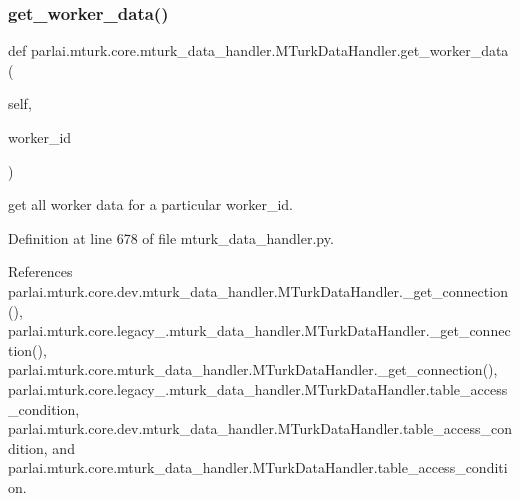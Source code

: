 \subsubsection{\texorpdfstring{get\+\_\+worker\+\_\+data()}{get\_worker\_data()}}
{\footnotesize\ttfamily def parlai.\+mturk.\+core.\+mturk\+\_\+data\+\_\+handler.\+M\+Turk\+Data\+Handler.\+get\+\_\+worker\+\_\+data (\begin{DoxyParamCaption}\item[{}]{self,  }\item[{}]{worker\+\_\+id }\end{DoxyParamCaption})}

\begin{DoxyVerb}get all worker data for a particular worker_id.\end{DoxyVerb}
 

Definition at line 678 of file mturk\+\_\+data\+\_\+handler.\+py.



References parlai.\+mturk.\+core.\+dev.\+mturk\+\_\+data\+\_\+handler.\+M\+Turk\+Data\+Handler.\+\_\+get\+\_\+connection(), parlai.\+mturk.\+core.\+legacy\+\_.\+mturk\+\_\+data\+\_\+handler.\+M\+Turk\+Data\+Handler.\+\_\+get\+\_\+connection(), parlai.\+mturk.\+core.\+mturk\+\_\+data\+\_\+handler.\+M\+Turk\+Data\+Handler.\+\_\+get\+\_\+connection(), parlai.\+mturk.\+core.\+legacy\+\_.\+mturk\+\_\+data\+\_\+handler.\+M\+Turk\+Data\+Handler.\+table\+\_\+access\+\_\+condition, parlai.\+mturk.\+core.\+dev.\+mturk\+\_\+data\+\_\+handler.\+M\+Turk\+Data\+Handler.\+table\+\_\+access\+\_\+condition, and parlai.\+mturk.\+core.\+mturk\+\_\+data\+\_\+handler.\+M\+Turk\+Data\+Handler.\+table\+\_\+access\+\_\+condition.


